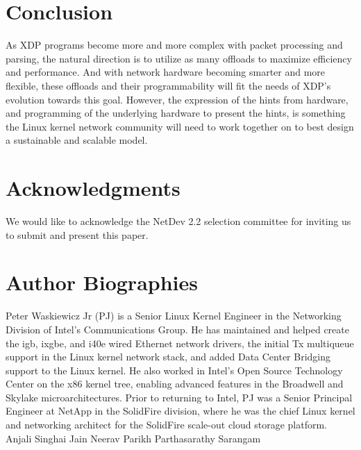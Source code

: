 \documentclass[letterpaper]{article}
\begin{document}
\section{Conclusion}
As XDP programs become more and more complex with packet processing and parsing, the natural direction is to utilize as many offloads to maximize efficiency and performance. And with network hardware becoming smarter and more flexible, these offloads and their programmability will fit the needs of XDP's evolution towards this goal. However, the expression of the hints from hardware, and programming of the underlying hardware to present the hints, is something the Linux kernel network community will need to work together on to best design a sustainable and scalable model.

\section{Acknowledgments}
We would like to acknowledge the NetDev 2.2 selection committee for inviting us to submit and present this paper.




\section{Author Biographies}
Peter Waskiewicz Jr (PJ) is a Senior Linux Kernel Engineer in the Networking Division of Intel's Communications Group. He has maintained and helped create the igb, ixgbe, and i40e wired Ethernet network drivers, the initial Tx multiqueue support in the Linux kernel network stack, and added Data Center Bridging support to the Linux kernel. He also worked in Intel's Open Source Technology Center on the x86 kernel tree, enabling advanced features in the Broadwell and Skylake microarchitectures. Prior to returning to Intel, PJ was a Senior Principal Engineer at NetApp in the SolidFire division, where he was the chief Linux kernel and networking architect for the SolidFire scale-out cloud storage platform.
\newline
\newline
Anjali Singhai Jain
\newline
\newline
Neerav Parikh
\newline
\newline
Parthasarathy Sarangam
\end{document}

